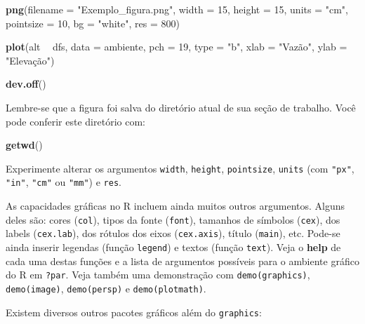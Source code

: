 \documentclass[
]{book}
\newenvironment{Shaded}{\begin{snugshade}}{\end{snugshade}}
\newcommand{\DataTypeTok}[1]{\textcolor[rgb]{0.13,0.29,0.53}{#1}}
\newcommand{\DecValTok}[1]{\textcolor[rgb]{0.00,0.00,0.81}{#1}}
\newcommand{\KeywordTok}[1]{\textcolor[rgb]{0.13,0.29,0.53}{\textbf{#1}}}
\newcommand{\NormalTok}[1]{#1}
\newcommand{\OperatorTok}[1]{\textcolor[rgb]{0.81,0.36,0.00}{\textbf{#1}}}
\newcommand{\StringTok}[1]{\textcolor[rgb]{0.31,0.60,0.02}{#1}}
\begin{document}
\begin{Shaded}
\begin{Highlighting}[]
\KeywordTok{png}\NormalTok{(}\DataTypeTok{filename =} \StringTok{"Exemplo_figura.png"}\NormalTok{,}
    \DataTypeTok{width =} \DecValTok{15}\NormalTok{, }\DataTypeTok{height =} \DecValTok{15}\NormalTok{, }\DataTypeTok{units =} \StringTok{"cm"}\NormalTok{, }
    \DataTypeTok{pointsize =} \DecValTok{10}\NormalTok{, }\DataTypeTok{bg =} \StringTok{"white"}\NormalTok{, }\DataTypeTok{res =} \DecValTok{800}\NormalTok{)}

\KeywordTok{plot}\NormalTok{(alt }\OperatorTok{~}\StringTok{ }\NormalTok{dfs, }\DataTypeTok{data =}\NormalTok{ ambiente, }\DataTypeTok{pch =} \DecValTok{19}\NormalTok{, }\DataTypeTok{type =} \StringTok{"b"}\NormalTok{, }
     \DataTypeTok{xlab =} \StringTok{"Vazão"}\NormalTok{, }\DataTypeTok{ylab =} \StringTok{"Elevação"}\NormalTok{)}

\KeywordTok{dev.off}\NormalTok{()}
\end{Highlighting}
\end{Shaded}

Lembre-se que a figura foi salva do diretório atual de sua seção de trabalho. Você pode conferir este diretório com:

\begin{Shaded}
\begin{Highlighting}[]
\KeywordTok{getwd}\NormalTok{()}
\end{Highlighting}
\end{Shaded}

Experimente alterar os argumentos \texttt{width}, \texttt{height}, \texttt{pointsize}, \texttt{units} (com \texttt{"px"}, \texttt{"in"}, \texttt{"cm"} ou \texttt{"mm"}) e \texttt{res}.

As capacidades gráficas no R incluem ainda muitos outros argumentos. Alguns deles são: cores (\texttt{col}), tipos da fonte (\texttt{font}), tamanhos de símbolos (\texttt{cex}), dos labels (\texttt{cex.lab}), dos rótulos dos eixos (\texttt{cex.axis}), título (\texttt{main}), etc. Pode-se ainda inserir legendas (função \texttt{legend}) e textos (função \texttt{text}). Veja o \textbf{help} de cada uma destas funções e a lista de argumentos possíveis para o ambiente gráfico do R em \texttt{?par}. Veja também uma demonstração com \texttt{demo(graphics)}, \texttt{demo(image)}, \texttt{demo(persp)} e \texttt{demo(plotmath)}.

Existem diversos outros pacotes gráficos além do \texttt{graphics}:
\end{document}
